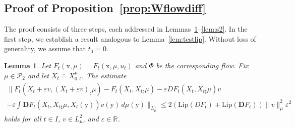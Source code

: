 \documentclass[sn-mathphys-num]{sn-jnl}
\numberwithin{equation}{section}
\theoremstyle{mythm}
\newtheorem{lemma}[proposition]{Lemma}
\theoremstyle{mydef}
\newcommand{\Lip}{\mathrm{Lip}}
\renewcommand{\d}{\,d}
\renewcommand{\mathbf}[1]{\bm{#1}}
\begin{document}
\subsection{Proof of Proposition~\ref{prop:Wflowdiff}}


The proof consists of three steps, each addressed in Lemmas~\ref{lem:O2vf}--\ref{lem:s2}. In the first step, we establish a result analogous to Lemma~\ref{lem:testlip}. Without loss of generality, we assume that \( t_0 = 0 \).

\begin{lemma}
  \label{lem:O2vf}
  Let \( F_t(\mathrm{x},\mu) = F_{t}(\mathrm{x},\mu,u_{t}) \) and \( \Phi \) be the corresponding flow.
  Fix \( \mu\in \mathcal{P}_2 \) and let \( X_t \doteq X_{0,t}^{\mu} \).
  The estimate
  \begin{multline}\label{eq:L1est}
    \Big\|F_{t} \left( X_{t} + \varepsilon v, (X_t + \varepsilon v)_{\sharp}\mu  \right) - F_{t}(X_t,X_{t\sharp}\mu)  - \varepsilon DF_{t}\left(X_t,X_{t\sharp}\mu\right)v\\
    - \varepsilon\int \mathbf{D}F_t\left(X_t,X_{t\sharp}\mu,X_{t}(\mathrm{y})\right)v(\mathrm{y})\d\mu(\mathrm{y})\Big\|_{L^1_\mu} \le 2\left(\Lip(DF_t)+\Lip(\mathbf{D}F_t)\right)\|v\|^2_{\mu}\varepsilon^2
  \end{multline}
  holds for all \( t \in I \), \( v \in {L}^2_{\mu} \), and \( \varepsilon \in \mathbb{R} \).
\end{lemma}
\end{document}
